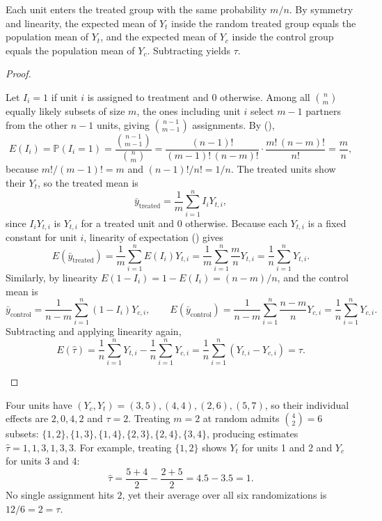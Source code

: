 \documentclass[10pt]{scrartcl}
\begin{document}
\begin{ideabox}
  Each unit enters the treated group with the same probability $m/n$. By symmetry and linearity, the expected mean of $Y_t$ inside the random treated group equals the population mean of $Y_t$, and the expected mean of $Y_c$ inside the control group equals the population mean of $Y_c$. Subtracting yields $\tau$.
\end{ideabox}

\begin{proof}
  \begin{steps}
    \ii Let $I_i = 1$ if unit $i$ is assigned to treatment and $0$ otherwise. Among all $\binom{n}{m}$ equally likely subsets of size $m$, the ones including unit $i$ select $m-1$ partners from the other $n-1$ units, giving $\binom{n-1}{m-1}$ assignments. By (),
    \[
      E(I_i) = \mathbb P(I_i = 1) = \frac{\binom{n-1}{m-1}}{\binom{n}{m}} = \frac{(n-1)!}{(m-1)!\,(n-m)!}\cdot\frac{m!\,(n-m)!}{n!} = \frac{m}{n},
    \]
    because $m!/(m-1)! = m$ and $(n-1)!/n! = 1/n$.
    \ii The treated units show their $Y_t$, so the treated mean is
    \[
      \bar y_{\text{treated}} = \frac{1}{m}\sum_{i=1}^n I_i Y_{t,i},
    \]
    since $I_iY_{t,i}$ is $Y_{t,i}$ for a treated unit and $0$ otherwise. Because each $Y_{t,i}$ is a fixed constant for unit $i$, linearity of expectation () gives
    \[
      E(\bar y_{\text{treated}}) = \frac{1}{m}\sum_{i=1}^n E(I_i) Y_{t,i} = \frac{1}{m}\sum_{i=1}^n \frac{m}{n} Y_{t,i} = \frac{1}{n}\sum_{i=1}^n Y_{t,i}.
    \]
    \ii Similarly, by linearity $E(1 - I_i) = 1 - E(I_i) = (n-m)/n$, and the control mean is
    \[
      \bar y_{\text{control}} = \frac{1}{n-m}\sum_{i=1}^n (1-I_i)Y_{c,i}, \qquad
      E(\bar y_{\text{control}}) = \frac{1}{n-m}\sum_{i=1}^n \frac{n-m}{n} Y_{c,i} = \frac{1}{n}\sum_{i=1}^n Y_{c,i}.
    \]
    \ii Subtracting and applying linearity again,
    \[
      E(\hat\tau) = \frac{1}{n}\sum_{i=1}^n Y_{t,i} - \frac{1}{n}\sum_{i=1}^n Y_{c,i} = \frac{1}{n}\sum_{i=1}^n (Y_{t,i} - Y_{c,i}) = \tau.
    \]
  \end{steps}
\end{proof}

\begin{example*}
  Four units have $(Y_c, Y_t) = (3,5), (4,4), (2,6), (5,7)$, so their individual effects are $2, 0, 4, 2$ and $\tau = 2$. Treating $m=2$ at random admits $\binom{4}{2} = 6$ subsets: $\{1,2\}, \{1,3\}, \{1,4\}, \{2,3\}, \{2,4\}, \{3,4\}$, producing estimates $\hat\tau = 1, 1, 3, 1, 3, 3$. For example, treating $\{1,2\}$ shows $Y_t$ for units 1 and 2 and $Y_c$ for units 3 and 4:
  \[
    \hat\tau = \frac{5+4}{2} - \frac{2+5}{2} = 4.5 - 3.5 = 1.
  \]
  No single assignment hits $2$, yet their average over all six randomizations is $12/6 = 2 = \tau$.
\end{example*}
\end{document}

